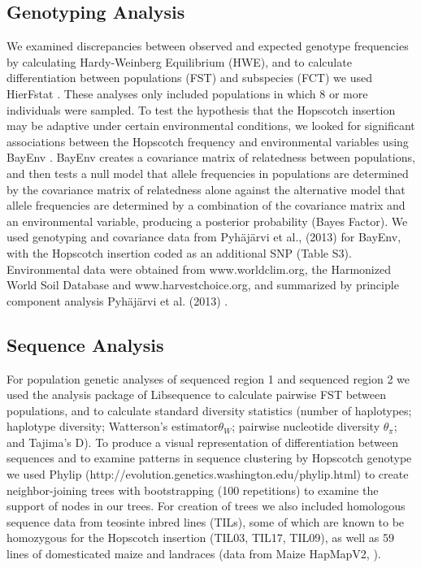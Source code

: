 \documentclass[12pt]{article}
\begin{document}
\subsection*{Genotyping Analysis}

We examined discrepancies between observed and expected genotype frequencies by calculating Hardy-Weinberg Equilibrium (HWE), and to calculate differentiation between populations (FST) and subspecies (FCT) we used HierFstat \cite{Goudet 2005}. These analyses only included populations in which 8 or more individuals were sampled. To test the hypothesis that the Hopscotch insertion may be adaptive under certain environmental conditions, we looked for significant associations between the Hopscotch frequency and environmental variables using BayEnv \cite{Coop et al 2010}. BayEnv creates a covariance matrix of relatedness between populations, and then tests a null model that allele frequencies in populations are determined by the covariance matrix of relatedness alone against the alternative model that allele frequencies are determined by a combination of the covariance matrix and an environmental variable, producing a posterior probability (Bayes Factor)\cite{Coop et al 2010}. We used genotyping and covariance data from Pyhäjärvi et al., (2013) \cite{Pyhajarvi et al 2013} for BayEnv, with the Hopscotch insertion coded as an additional SNP (Table S3). Environmental data were obtained from www.worldclim.org, the Harmonized World Soil Database and www.harvestchoice.org, and summarized by principle component analysis Pyhäjärvi et al. (2013) \cite{Pyhajarvi et al 2013}.

\subsection*{Sequence Analysis}

For population genetic analyses of sequenced region 1 and sequenced region 2 we used the analysis package of Libsequence \cite{Thornton 2003} to calculate pairwise FST between populations, and to calculate standard diversity statistics (number of haplotypes; haplotype diversity; Watterson's estimator$\theta_{W}$; pairwise nucleotide diversity $\theta_{\pi}$; and Tajima's D). To produce a visual representation of differentiation between sequences and to examine patterns in sequence clustering by Hopscotch genotype we used Phylip (http://evolution.genetics.washington.edu/phylip.html) to create neighbor-joining trees with bootstrapping (100 repetitions) to examine the support of nodes in our trees. For creation of trees we also included homologous sequence data from teosinte inbred lines (TILs), some of which are known to be homozygous for the Hopscotch insertion (TIL03, TIL17, TIL09), as well as 59 lines of domesticated maize and landraces (data from Maize HapMapV2, \cite{Chia et al 2012}).
\end{document}
